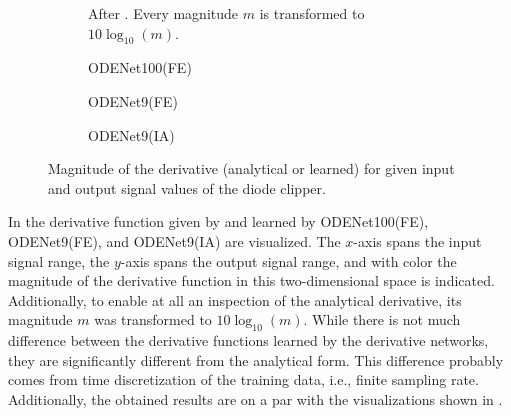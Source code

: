 \begin{figure}
    \centering
    \begin{subfigure}{0.9\textwidth}
        \centering
        \scalebox{\subfigureScale}{}
        \caption{After . Every magnitude $m$ is transformed to $10 \log_{10}(m)$.}
    \end{subfigure}
    \begin{subfigure}{0.9\textwidth}
        \centering
        \scalebox{\subfigureScale}{}
        \caption{ODENet100(FE)}
    \end{subfigure}
    \begin{subfigure}{\subfigureWidth}
        \scalebox{0.75}{}
        \caption{ODENet9(FE)}
    \end{subfigure}
    \begin{subfigure}{\subfigureWidth}
        \scalebox{0.76}{}
        \caption{ODENet9(IA)}
    \end{subfigure}
    \caption{Magnitude of the derivative (analytical or learned) for given input and output signal values of the diode clipper.}
    \label{fig:diode_clipper_derivative_visualizations}
\end{figure}

In  the derivative function given by  and learned by ODENet100(FE), ODENet9(FE), and ODENet9(IA)  are visualized. The $x$-axis spans the input signal range, the $y$-axis spans the output signal range, and with color the magnitude of the derivative function in this two-dimensional space is indicated. Additionally, to enable at all an inspection of the analytical derivative, its magnitude $m$ was transformed to $10 \log_{10}(m)$. While there is not much difference between the derivative functions learned by the derivative networks, they are significantly different from the analytical form. This difference probably comes from time discretization of the training data, i.e., finite sampling rate. Additionally, the obtained results are on a par with the visualizations shown in \cite{Parker2019}.
